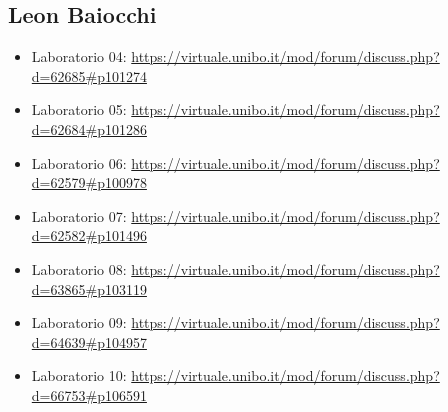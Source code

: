 \subsection{Leon Baiocchi}

\begin{itemize}
	\item Laboratorio 04: \url{https://virtuale.unibo.it/mod/forum/discuss.php?d=62685#p101274}
	\item Laboratorio 05: \url{https://virtuale.unibo.it/mod/forum/discuss.php?d=62684#p101286}
	\item Laboratorio 06: \url{https://virtuale.unibo.it/mod/forum/discuss.php?d=62579#p100978}
	\item Laboratorio 07: \url{https://virtuale.unibo.it/mod/forum/discuss.php?d=62582#p101496}
	\item Laboratorio 08: \url{https://virtuale.unibo.it/mod/forum/discuss.php?d=63865#p103119}
	\item Laboratorio 09: \url{https://virtuale.unibo.it/mod/forum/discuss.php?d=64639#p104957}
	\item Laboratorio 10: \url{https://virtuale.unibo.it/mod/forum/discuss.php?d=66753#p106591}
\end{itemize}



